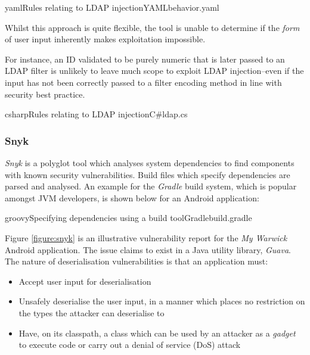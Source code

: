 \documentclass[a4paper,openany,12pt]{book}
\begin{document}
\begin{mycodefile}{yaml}{\label{code:scs:2}Rules relating to LDAP injection}{YAML}{behavior.yaml}
\end{mycodefile}

Whilst this approach is quite flexible, the tool is unable to determine if the \textit{form} of user input inherently
makes exploitation impossible.

For instance, an ID validated to be purely numeric that is later passed to an LDAP filter is unlikely to leave much
scope to exploit LDAP injection--even if the input has not been correctly passed to a filter encoding method in
line with security best practice.

\begin{mycodefile}{csharp}{\label{code:scs:3}Rules relating to LDAP injection}{C\#}{ldap.cs}
\end{mycodefile}

\subsubsection{Snyk}

\emph{Snyk} is a polyglot tool which analyses system dependencies to find components with known security vulnerabilities.
Build files which specify dependencies are parsed and analysed.
An example for the \emph{Gradle} build system, which is popular amongst JVM developers, is shown below for an Android
application:

\begin{mycodefile}{groovy}{\label{code:gradle:1}Specifying dependencies using a build tool}{Gradle}{build.gradle}
\end{mycodefile}

Figure \ref{figure:snyk} is an illustrative vulnerability report for the \emph{My Warwick} Android application.
The issue claims to exist in a Java utility library, \emph{Guava}.
The nature of deserialisation vulnerabilities is that an application must:

\begin{itemize}
    \item Accept user input for deserialisation
    \item Unsafely deserialise the user input, in a manner which places no restriction on the types the attacker can
          deserialise to
    \item Have, on its classpath, a class which can be used by an attacker as a \emph{gadget} to execute code or carry
          out a denial of service (DoS) attack
\end{itemize}
\end{document}
